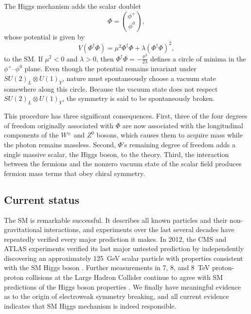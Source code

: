 The Higgs mechanism adds the scalar doublet
\begin{equation}
    \Phi = \binom{\phi^{+}}{\phi^{0}},
\end{equation}
whose potential is given by
\begin{equation}
    V(\Phi^{\dagger}\Phi) = \mu^{2}\Phi^{\dagger}\Phi + \lambda(\Phi^{\dagger}\Phi)^{2},
\end{equation}
to the SM. If $\mu^{2}<0$ and $\lambda>0$, then $\Phi^{\dagger}\Phi = -\frac{\mu^{2}}{2\lambda}$ defines a circle of minima in the $\phi^{+}$--$\phi^{0}$ plane. Even though the potential remains invariant under $SU(2)_{L} \otimes U(1)_{Y}$, nature must spontaneously choose a vacuum state somewhere along this circle. Because the vacuum state does not respect $SU(2)_{L} \otimes U(1)_{Y}$, the symmetry is said to be spontaneously broken.

This procedure has three significant consequences. First, three of the four degrees of freedom originally associated with $\Phi$ are now associated with the longitudinal components of the $W^{\pm}$ and $Z^{0}$ bosons, which causes them to acquire mass while the photon remains massless. Second, $\Phi$'s remaining degree of freedom adds a single massive scalar, the Higgs boson, to the theory. Third, the interaction between the fermions and the nonzero vacuum state of the scalar field produces fermion mass terms that obey chiral symmetry.


\subsection{Current status}
The SM is remarkable successful. It describes all known particles and their non-gravitational interactions, and experiments over the last several decades have repeatedly verified every major prediction it makes. In 2012, the CMS and ATLAS experiments verified its last major untested prediction by independently discovering an approximately \SI{125}{\GeV} scalar particle with properties consistent with the SM Higgs boson \cite{cms_higgs, atlas_higgs}. Further measurements in \num{7}, \num{8}, and \SI{8}{\TeV} proton-proton collisions at the Large Hadron Collider continue to agree with SM predictions of the Higgs boson properties . We finally have meaningful evidence as to the origin of electroweak symmetry breaking, and all current evidence indicates that SM Higgs mechanism is indeed responsible.

